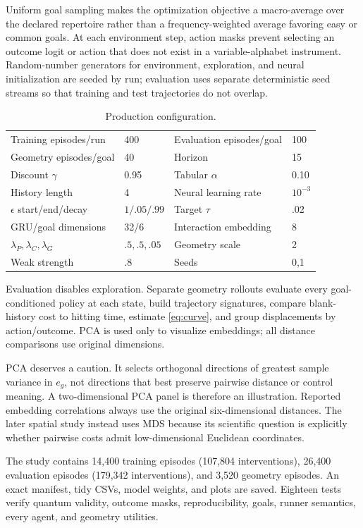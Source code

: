 \documentclass[11pt]{article}
\begin{document}
Uniform goal sampling makes the optimization objective a macro-average over
the declared repertoire rather than a frequency-weighted average favoring easy
or common goals. At each environment step, action masks prevent selecting an
outcome logit or action that does not exist in a variable-alphabet instrument.
Random-number generators for environment, exploration, and neural
initialization are seeded by run; evaluation uses separate deterministic seed
streams so that training and test trajectories do not overlap.

\begin{table}[t]
\centering
\caption{Production configuration.}
\label{tab:hypers}
\begin{tabular}{@{}ll@{\qquad}ll@{}}
\toprule
Training episodes/run & 400 & Evaluation episodes/goal & 100\\
Geometry episodes/goal & 40 & Horizon & 15\\
Discount $\gamma$ & 0.95 & Tabular $\alpha$ & 0.10\\
History length & 4 & Neural learning rate & $10^{-3}$\\
$\epsilon$ start/end/decay & $1/.05/.99$ & Target $\tau$ & .02\\
GRU/goal dimensions & 32/6 & Interaction embedding & 8\\
$\lambda_P,\lambda_C,\lambda_G$ & $.5,.5,.05$ & Geometry scale & 2\\
Weak strength & .8 & Seeds & 0,1\\
\bottomrule
\end{tabular}
\end{table}

Evaluation disables exploration. Separate geometry rollouts evaluate every
goal-conditioned policy at each state, build trajectory signatures, compare
blank-history cost to hitting time, estimate \cref{eq:curve}, and group
displacements by action/outcome. PCA is used only to visualize embeddings; all
distance comparisons use original dimensions.

PCA deserves a caution. It selects orthogonal directions of greatest sample
variance in $e_g$, not directions that best preserve pairwise distance or
control meaning. A two-dimensional PCA panel is therefore an illustration.
Reported embedding correlations always use the original six-dimensional
distances. The later spatial study instead uses MDS because its scientific
question is explicitly whether pairwise costs admit low-dimensional Euclidean
coordinates.

The study contains 14,400 training episodes (107,804 interventions), 26,400
evaluation episodes (179,342 interventions), and 3,520 geometry episodes. An
exact manifest, tidy CSVs, model weights, and plots are saved. Eighteen tests
verify quantum validity, outcome masks, reproducibility, goals, runner
semantics, every agent, and geometry utilities.
\end{document}
